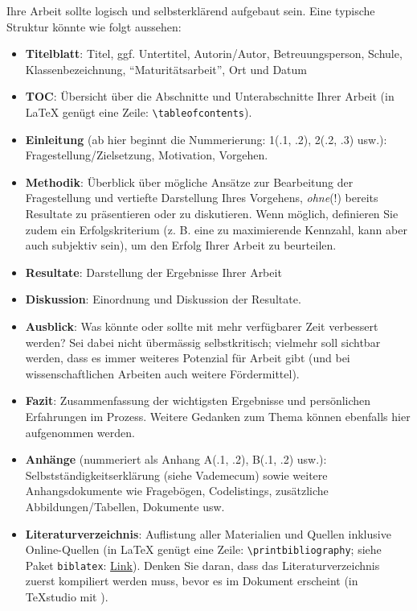 Ihre Arbeit sollte logisch und selbsterklärend aufgebaut sein. Eine typische Struktur könnte wie folgt aussehen:
\begin{itemize}
	\item \textbf{Titelblatt}: Titel, ggf. Untertitel, Autorin/Autor, Betreuungsperson, Schule, Klassenbezeichnung, \enquote{Maturitätsarbeit}, Ort und Datum
	\item \textbf{\acrlong{TOC}}: Übersicht über die Abschnitte und Unterabschnitte Ihrer Arbeit (in \LaTeX{} genügt eine Zeile: \lstinline|\tableofcontents|).
	\item \textbf{Einleitung} (ab hier beginnt die Nummerierung: 1(.1, .2), 2(.2, .3) usw.): Fragestellung/Zielsetzung, Motivation, Vorgehen.
	\item \textbf{Methodik}: Überblick über mögliche Ansätze zur Bearbeitung der Fragestellung und vertiefte Darstellung Ihres Vorgehens, \textit{ohne}(!) bereits Resultate zu präsentieren oder zu diskutieren. Wenn möglich, definieren Sie zudem ein Erfolgskriterium (z. B. eine zu maximierende Kennzahl, kann aber auch subjektiv sein), um den Erfolg Ihrer Arbeit zu beurteilen.
	\item \textbf{Resultate}: Darstellung der Ergebnisse Ihrer Arbeit
	\item \textbf{Diskussion}: Einordnung und Diskussion der Resultate.
	\item \textbf{Ausblick}: Was könnte oder sollte mit mehr verfügbarer Zeit verbessert werden? Sei dabei nicht übermässig selbstkritisch; vielmehr soll sichtbar werden, dass es immer weiteres Potenzial für Arbeit gibt (und bei wissenschaftlichen Arbeiten auch weitere Fördermittel).
	\item \textbf{Fazit}: Zusammenfassung der wichtigsten Ergebnisse und persönlichen Erfahrungen im Prozess. Weitere Gedanken zum Thema können ebenfalls hier aufgenommen werden.
	\item \textbf{Anhänge} (nummeriert als Anhang A(.1, .2), B(.1, .2) usw.): Selbstständigkeitserklärung (siehe Vademecum) sowie weitere Anhangsdokumente wie Fragebögen, Codelistings, zusätzliche Abbildungen/Tabellen, Dokumente usw.
	\item \textbf{Literaturverzeichnis}: Auflistung aller Materialien und Quellen inklusive Online-Quellen (in \LaTeX{} genügt eine Zeile: \lstinline|\printbibliography|; siehe Paket \lstinline|biblatex|: \href{https://de.overleaf.com/learn/latex/Bibliography_management_with_biblatex}{Link}). Denken Sie daran, dass das Literaturverzeichnis zuerst kompiliert werden muss, bevor es im Dokument erscheint (in TeXstudio mit ).

\end{itemize}
